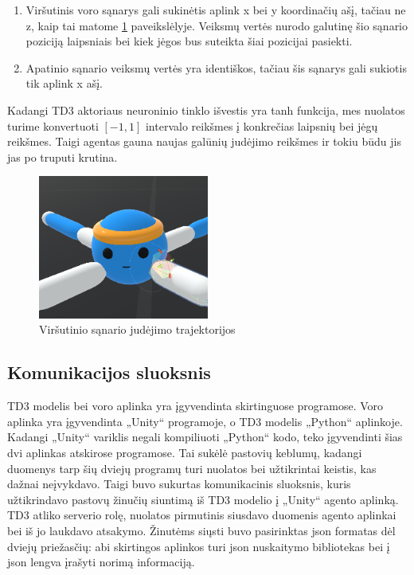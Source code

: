 \documentclass[a4paper, 12pt]{article}
\begin{document}
\begin{enumerate}
  \addtolength{\itemsep}{-0.5\baselineskip} 
  \item Viršutinis voro sąnarys gali sukinėtis aplink x bei y koordinačių ašį, tačiau ne z, kaip tai matome \ref{SanarioJudejimoTrajektorijos} paveikslėlyje. Veiksmų vertės nurodo galutinę šio sąnario poziciją laipsniais bei kiek jėgos bus suteikta šiai pozicijai pasiekti.
  \item Apatinio sąnario veiksmų vertės yra identiškos, tačiau šis sąnarys gali sukiotis tik aplink x ašį.
\end{enumerate}

Kadangi TD3 aktoriaus neuroninio tinklo išvestis yra tanh funkcija, mes nuolatos turime konvertuoti $[-1,1]$ intervalo reikšmes į konkrečias laipsnių bei jėgų reikšmes. Taigi agentas gauna naujas galūnių judėjimo reikšmes ir tokiu būdu jis jas po truputi krutina.

\begin{figure}[h]
\centering
\includegraphics[width=0.5\textwidth]{SanarioJudejimoTrajektorijos}
\caption{Viršutinio sąnario judėjimo trajektorijos}
\label{SanarioJudejimoTrajektorijos}
\end{figure}


\subsection{Komunikacijos sluoksnis}

TD3 modelis bei voro aplinka yra įgyvendinta skirtinguose programose. Voro aplinka yra įgyvendinta „Unity“ programoje, o TD3 modelis „Python“ aplinkoje. Kadangi „Unity“ variklis negali kompiliuoti „Python“ kodo, teko įgyvendinti šias dvi aplinkas atskirose programose. Tai sukėlė pastovių keblumų, kadangi duomenys tarp šių dviejų programų turi nuolatos bei užtikrintai keistis, kas dažnai neįvykdavo. Taigi buvo sukurtas komunikacinis sluoksnis, kuris užtikrindavo pastovų žinučių siuntimą iš TD3 modelio į „Unity“ agento aplinką. TD3 atliko serverio rolę, nuolatos pirmutinis siusdavo duomenis agento aplinkai bei iš jo laukdavo atsakymo. Žinutėms siųsti buvo pasirinktas json formatas dėl dviejų priežasčių: abi skirtingos aplinkos turi json nuskaitymo bibliotekas bei į json lengva įrašyti norimą informaciją. 
\end{document}
